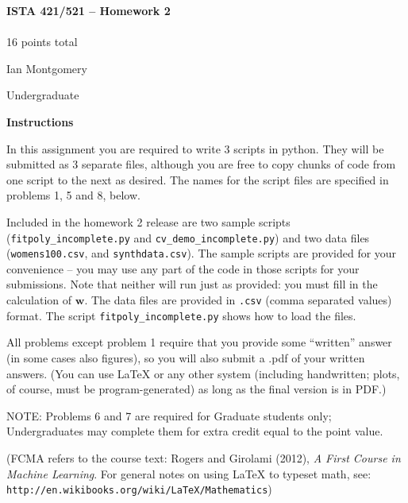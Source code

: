 \documentclass[10pt]{article}
\newcommand{\latex}{\LaTeX\xspace}
\begin{document}
\begin{center}
    {\Large {\bf ISTA 421/521 -- Homework 2}} \\
     \\
    16 points total
\end{center}

\begin{flushright}
Ian Montgomery

Undergraduate
\end{flushright}

\vspace{1cm}
{\Large {\bf Instructions}}

In this assignment you are required to write 3 scripts in python.  They will be submitted as 3 separate files, although you are free to copy chunks of code from one script to the next as desired.  The names for the script files are specified in problems 1, 5 and 8, below.

Included in the homework 2 release are two sample scripts ({\tt fitpoly\_incomplete.py} and {\tt cv\_demo\_incomplete.py}) and two data files ({\tt womens100.csv}, and {\tt synthdata.csv}).  The sample scripts are provided for your convenience -- you may use any part of the code in those scripts for your submissions.  Note that neither will run just as provided: you must fill in the calculation of $\mathbf{w}$.  The data files are provided in {\tt .csv} (comma separated values) format.  The script {\tt fitpoly\_incomplete.py} shows how to load the files.

All problems except problem 1 require that you provide some ``written'' answer (in some cases also figures), so you will also submit a .pdf of your written answers.  (You can use \latex or any other system (including handwritten; plots, of course, must be program-generated) as long as the final version is in PDF.)


NOTE: Problems 6 and 7 are required for Graduate students only; Undergraduates may complete them for extra credit equal to the point value.

(FCMA refers to the course text: Rogers and Girolami (2012), {\em A First Course in Machine Learning}.  For general notes on using \latex to typeset math, see: {\tt http://en.wikibooks.org/wiki/LaTeX/Mathematics})
\vspace{.5cm}
\end{document}

